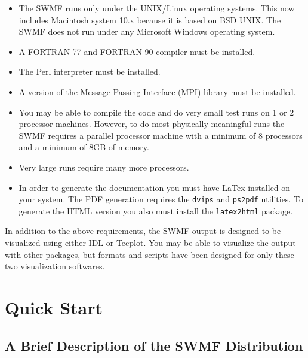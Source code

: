 \begin{itemize}
\item The SWMF runs only under the UNIX/Linux operating systems.  This now
  includes Macintosh system 10.x because it is based on BSD UNIX.  The
  SWMF does not run under any Microsoft Windows operating system.
\item A FORTRAN 77 and FORTRAN 90 compiler must be installed.
\item The Perl interpreter must be installed.
\item A version of the Message Passing Interface (MPI) library must be
  installed.
\item You may be able to compile the code and do very small test
runs on 1 or 2 processor machines.  However, to do most physically
meaningful runs the SWMF requires a
parallel processor machine with a minimum of 8 processors and a minimum of 8GB of
memory.
\item Very large runs require many more processors.
\item In order to generate the documentation you must have LaTex installed on
your system.  The PDF generation requires the {\tt dvips} and {\tt ps2pdf}
utilities.  To generate the HTML version you also must install the
{\tt latex2html} package. 

\end{itemize}


In addition to the above requirements, the SWMF output is designed to
be visualized using either IDL or Tecplot.  You may be able to
visualize the output with other packages, but formats and scripts have
been designed for only these two visualization softwares.





\chapter{Quick Start}

\section{A Brief Description of the SWMF Distribution}

